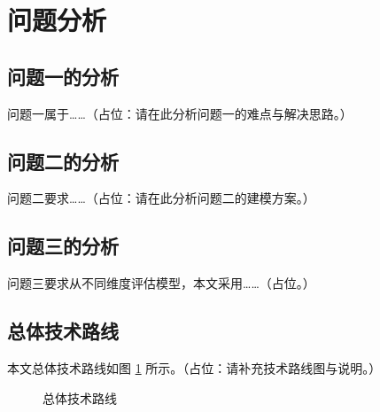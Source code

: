 \section{问题分析}

\subsection{问题一的分析}
问题一属于……（占位：请在此分析问题一的难点与解决思路。）

\subsection{问题二的分析}
问题二要求……（占位：请在此分析问题二的建模方案。）

\subsection{问题三的分析}
问题三要求从不同维度评估模型，本文采用……（占位。）

\subsection{总体技术路线}
本文总体技术路线如图 \ref{fig:route} 所示。（占位：请补充技术路线图与说明。）

\begin{figure}[H]
\centering
\caption{总体技术路线}\label{fig:route}
\end{figure}
